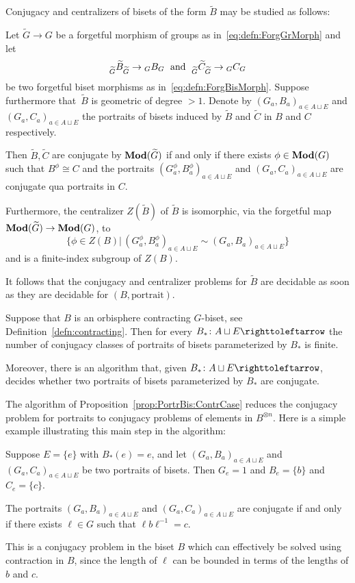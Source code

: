 \documentclass{amsart}
\begin{document}
\noindent Conjugacy and centralizers of bisets of the form
$\widetilde B$ may be studied as follows:
\begin{thm}\label{thm:RedConjCentrProb}
  Let $\widetilde G\to G$ be a forgetful morphism of groups as
  in~\eqref{eq:defn:ForgGrMorph} and let
  \[\subscript{\widetilde G}{\widetilde
      B}_{\widetilde G}\to \subscript G B_G\;\text{ and }\; \subscript{\widetilde
      G}{\widetilde C}_{\widetilde G}\to \subscript G C_G
  \]
  be two forgetful biset morphisms as in~\eqref{eq:defn:ForgBisMorph}.
  Suppose furthermore that~$\widetilde B$ is geometric of degree
  $>1$. Denote by $(G_a,B_a)_{a\in A\sqcup E}$ and
  $(G_a,C_a)_{a\in A\sqcup E}$ the portraits of bisets induced by
  $\widetilde B$ and $\widetilde C$ in $B$ and $C$ respectively.

  Then $\widetilde B,\widetilde C$ are conjugate by
  $\mathbf{\relax Mod}(\widetilde G)$ if and only if there exists
  $\phi\in\mathbf{\relax Mod}(G)$ such that $B^\phi\cong C$ and the portraits
  $(G_a^\phi,B_a^\phi)_{a\in A\sqcup E}$ and $(G_a,C_a)_{a\in A\sqcup
    E}$ are conjugate qua portraits in $C$.

  Furthermore, the centralizer $Z(\widetilde B)$ of $\widetilde B$ is
  isomorphic, via the forgetful map $\mathbf{\relax Mod}(\widetilde
  G)\to\mathbf{\relax Mod}(G)$, to
  \[\big\{\phi\in Z(B)
  \big|\,(G_a^{\phi},B_a^{\phi})_{a\in A\sqcup E}\sim(G_a,B_a)_{a\in
    A\sqcup E}\big\}
  \]
  and is a finite-index subgroup of $Z(B)$.
\end{thm}
It follows that the conjugacy and centralizer problems for
$\widetilde B$ are decidable as soon as they are decidable for
$(B,\text{portrait})$.

\begin{prop}\label{prop:PortrBis:ContrCase}
  Suppose that $B$ is an orbisphere contracting $G$-biset, see
  Definition~\ref{defn:contracting}. Then for every
  $B_*\colon A\sqcup E\selfmap$ the number of conjugacy classes of
  portraits of bisets parameterized by $B_*$ is finite.

  Moreover, there is an algorithm that, given
  $B_*\colon A\sqcup E\selfmap$, decides whether two portraits of
  bisets parameterized by $B_*$ are conjugate.
\end{prop}
The algorithm of Proposition~\ref{prop:PortrBis:ContrCase} reduces the
conjugacy problem for portraits to conjugacy problems of elements in
$B^{\otimes n}$. Here is a simple example illustrating this main step
in the algorithm:
\begin{exple}
  Suppose $E=\{e\}$ with $B_*(e)=e$, and let $(G_a,B_a)_{a\in A\sqcup
    E}$ and $(G_a,C_a)_{a\in A\sqcup E}$ be two portraits of
  bisets. Then $G_e=1$ and $B_e=\{b\}$ and $C_e=\{c\}$.

  The portraits $(G_a,B_a)_{a\in A\sqcup E}$ and $(G_a,C_a)_{a\in
    A\sqcup E}$ are conjugate if and only if there exists $\ell \in G$
  such that $\ell b \ell^{-1}=c$.

  This is a conjugacy problem in the biset $B$ which can effectively
  be solved using contraction in $B$, since the length of $\ell$ can
  be bounded in terms of the lengths of $b$ and $c$.
\end{exple}
\end{document}

